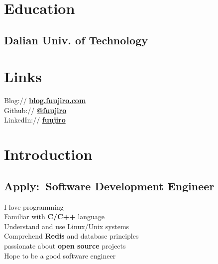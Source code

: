 \documentclass[]{deedy-resume-openfont}
\begin{document}
%
%
\lastupdated

%
%

%
%

\begin{minipage}[t]{0.25\textwidth} 


\section{Education} 

\subsection{Dalian Univ. of Technology}
\sectionsep


\section{Links}
\sectionsep
Blog://  \href{https://blog.fuujiro.com/}{\bf blog.fuujiro.com} \\  
Github:// \href{https://github.com/fuujiro}{\bf @fuujiro} \\
LinkedIn://  \href{https://www.linkedin.com/in/fuujiro}{\bf fuujiro} \\


\section{Introduction}
\subsection{Apply:\  Software Development Engineer}
I love programming \\
Familiar with \textbf{C/C++} language \\
Understand and use Linux/Unix systems \\
Comprehend \textbf{Redis} and database principles \\
passionate about \textbf{open source} projects \\
Hope to be a good software engineer \\
\sectionsep


\end{minipage}
\end{document}
